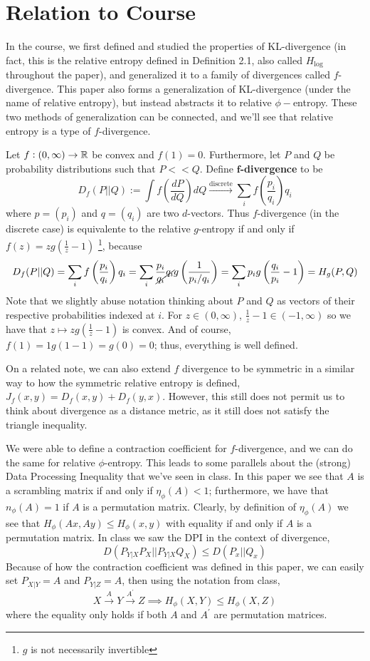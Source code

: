 \section{Relation to Course}
In the course, we first defined and studied the properties of KL-divergence (in fact, this is the relative entropy defined in Definition 2.1, also called $H_{\log}$ throughout the paper), and generalized it to a family of divergences called $f$-divergence. This paper also forms a generalization of KL-divergence (under the name of relative entropy), but instead abstracts it to relative $\phi-$entropy. These two methods of generalization can be connected, and we'll see that relative entropy is a type of $f$-divergence. 

Let $f: (0, \infty) \to \mathbb{R}$ be convex and $f(1) = 0$. Furthermore, let $P$ and $Q$ be probability distributions such that $P <\!< Q$. Define $\bm{f}$\textbf{-divergence} to be 
\[D_f(P || Q):= \int f\left(\frac{dP}{dQ}\right)dQ \xrightarrow{\text{discrete}} \sum_i f\left(\frac{p_i}{q_i}\right)q_i\]
where $p = (p_i)$ and $q = (q_i)$ are two $d$-vectors. Thus $f$-divergence (in the discrete case) is equivalente to the relative $g$-entropy if and only if $f(z) = z g\left(\frac{1}{z}-1\right)$ \footnote{$g$ is not necessarily invertible}, because \[D_f(P|| Q) = \sum_i f\left(\frac{p_i}{q_i}\right)q_i = \sum_i \frac{p_i}{\cancel{q_i}}\cancel{q_i}g\left(\frac{1}{p_i/q_i}\right)=\sum_i p_i g\left(\frac{q_i}{p_i} - 1\right) = H_g(P, Q)\]
Note that we slightly abuse notation thinking about $P$ and $Q$ as vectors of their respective probabilities indexed at $i$. For $z \in (0, \infty)$, $\frac{1}{z}-1 \in (-1, \infty)$ so we have that $z \mapsto zg\left(\frac{1}{z}-1\right)$ is convex. And of course, $f(1) = 1g(1 - 1) = g(0) = 0$; thus, everything is well defined.

On a related note, we can also extend $f$ divergence to be symmetric in a similar way to how the symmetric relative entropy is defined, $J_{f}(x,y) = D_f(x,y) + D_f(y,x)$. However, this still does not permit us to think about divergence as a distance metric, as it still does not satisfy the triangle inequality.

We were able to define a contraction coefficient for $f$-divergence, and we can do the same for relative $\phi$-entropy. This leads to some parallels about the (strong) Data Processing Inequality that we've seen in class. In this paper we see that $A$ is a scrambling matrix if and only if $\eta_{\phi}(A) < 1$; furthermore, we have that $n_\phi(A)=1$ if $A$ is a permutation matrix. Clearly, by definition of $\eta_\phi(A)$ we see that $H_{\phi}(Ax,Ay)  \leq H_{\phi}(x,y)$ with equality if and only if $A$ is a permutation matrix. In class we saw the DPI in the context of divergence,\[D(P_{Y|X}P_X||P_{Y|X}Q_X) \leq D(P_x||Q_x)\] Because of how the contraction coefficient was defined in this paper, we can easily set $P_{X|Y} = A$ and $P_{Y|Z} = A$, then using the notation from class, 
\[X \xrightarrow{A} Y \xrightarrow{A^\prime} Z \implies H_{\phi}(X,Y) \leq H_{\phi}(X,Z)\]
where the equality only holds if both $A$ and $A^\prime$ are permutation matrices.

    